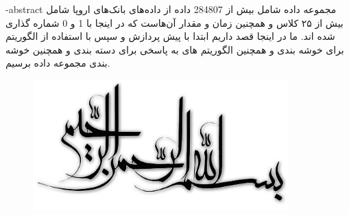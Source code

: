 
\fa-abstract{
مجموعه داده شامل بیش از 284807 داده از داده‌‌های بانک‌های اروپا شامل بیش از ۲۵ کلاس و همچنین زمان و مقدار آن‌هاست که در اینجا با 1 و 0 شماره گذاری شده اند.
ما در اینجا قصد داریم ابتدا با پیش پردازش و سپس با استفاده از الگوریتم  برای خوشه بندی و همچنین الگوریتم های  
به پاسخی برای دسته بندی و همچنین خوشه بندی مجموعه داده برسیم.	
}





\vspace*{7cm}
\thispagestyle{empty}
\begin{center}
	\includegraphics[height=5cm,width=12cm]{Images/besm.jpg}
\end{center}